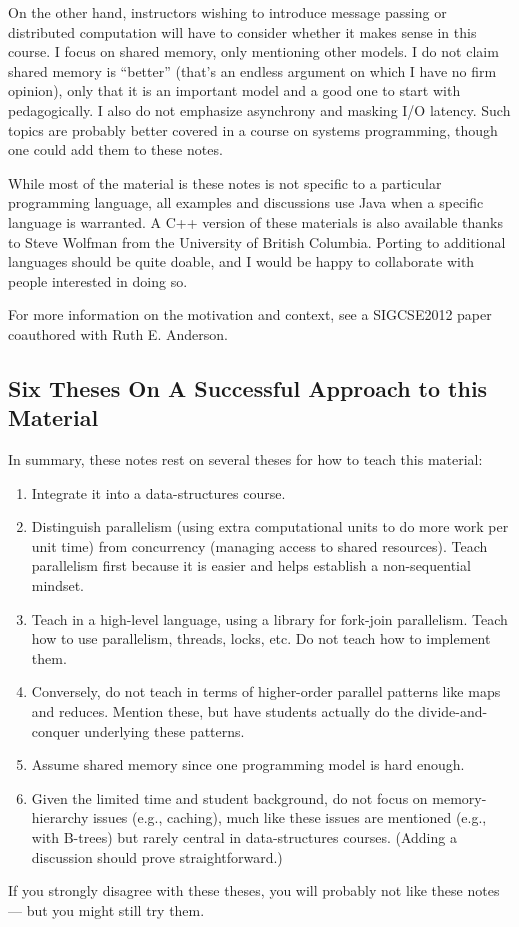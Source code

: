 \documentclass[10pt]{article}
\begin{document}
On the other hand, instructors wishing to introduce message passing or
distributed computation will have to consider whether it makes sense
in this course.  I focus on shared memory, only mentioning other
models.  I do not claim shared memory is ``better'' (that's an endless
argument on which I have no firm opinion), only that it is an
important model and a good one to start with pedagogically.  I also do
not emphasize asynchrony and masking I/O latency.  Such topics are
probably better covered in a course on systems programming, though one
could add them to these notes.

While most of the material is these notes is not specific to a
particular programming language, all examples and discussions use Java
when a specific language is warranted.  A C++ version of these
materials is also available thanks to Steve Wolfman from
the University of British Columbia.  Porting to additional languages
should be quite doable, and I would be happy to collaborate with people
interested in doing so.

For more information on the motivation and context, see a SIGCSE2012
paper coauthored with Ruth E. Anderson.%

\subsection{Six Theses On A Successful Approach to this Material}

In summary, these notes rest on several theses for how to teach this
material:
\begin{enumerate}
\item Integrate it into a data-structures course.
\item Distinguish parallelism (using extra computational units to do more work
  per unit time) from concurrency (managing access to shared
  resources).  Teach parallelism first because it is easier and helps
  establish a non-sequential mindset.
\item Teach in a high-level language, using a library for fork-join
  parallelism.  Teach how to use parallelism, threads, locks, etc.  Do
  not teach how to implement them.  
\item Conversely, do not teach in terms
  of higher-order parallel patterns like maps and reduces.  Mention
  these, but have students actually do the divide-and-conquer
  underlying these patterns.
\item Assume shared memory since one programming model is hard enough.
  \item Given the limited time and student background, do not focus on
  memory-hierarchy issues (e.g., caching), much like these issues are
  mentioned (e.g., with B-trees) but rarely central in data-structures
  courses. (Adding a discussion should prove straightforward.)
\end{enumerate}
If you strongly disagree with these theses, you will probably
not like these notes --- but you might still try them.
\end{document}
